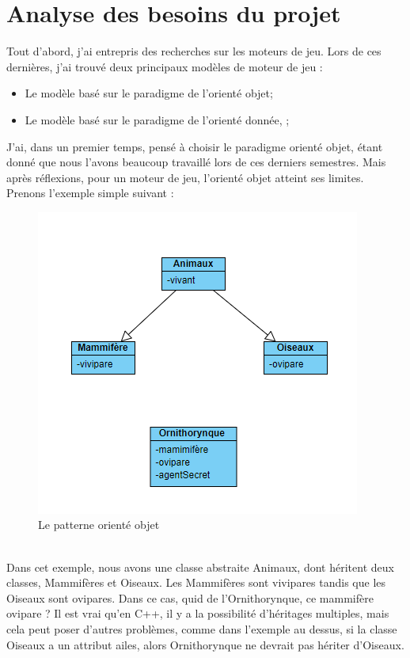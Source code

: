 \documentclass[12pt, openany]{report}
\begin{document}
\chapter{Analyse des besoins du projet}
Tout d'abord, j'ai entrepris des recherches sur les moteurs de jeu. Lors de ces derni\`eres, j'ai trouv\'e deux principaux mod\`eles de  moteur de jeu :
\begin{itemize}
\item Le mod\`ele bas\'e sur le paradigme de l'orient\'e objet;
\item Le mod\`ele bas\'e sur le paradigme de l'orient\'e donn\'ee, ;
\end{itemize}
\indent J'ai, dans un premier temps, pens\'e \`a choisir le paradigme orient\'e objet, \'etant donn\'e que nous l'avons beaucoup travaill\'e lors de ces derniers semestres. Mais apr\`es r\'eflexions, pour un moteur de jeu, l'orient\'e objet atteint ses limites. Prenons l'exemple simple suivant :
\\[0.2cm]
\begin{figure}[!h]
\centering
\includegraphics[scale=1]{illustrationOO.png}
\caption{Le patterne orient\'e objet}
\end{figure}
\newpage
~\\[1cm]
\indent Dans cet exemple, nous avons une classe abstraite Animaux, dont h\'eritent deux classes, Mammif\`eres et Oiseaux. Les Mammif\`eres sont vivipares tandis que les Oiseaux sont ovipares. Dans ce cas, quid de l'Ornithorynque, ce mammif\`ere ovipare ? Il est vrai qu'en C++, il y a la possibilit\'e d'h\'eritages multiples, mais cela peut poser d'autres probl\`emes, comme dans l'exemple au dessus, si la classe Oiseaux a un attribut ailes, alors Ornithorynque ne devrait pas h\'eriter d'Oiseaux.
\end{document}
